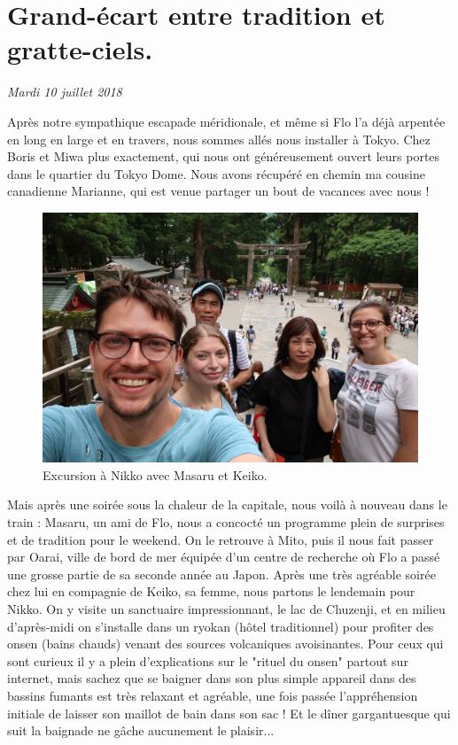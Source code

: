 \hypertarget{grand-uxe9cart-entre-tradition-et-gratte-ciels.}{%
\section{Grand-écart entre tradition et
gratte-ciels.}\label{grand-uxe9cart-entre-tradition-et-gratte-ciels.}}

\emph{Mardi 10 juillet 2018}

Après notre sympathique escapade méridionale, et même si Flo l'a déjà
arpentée en long en large et en travers, nous sommes allés nous
installer à Tokyo. Chez Boris et Miwa plus exactement, qui nous ont
généreusement ouvert leurs portes dans le quartier du Tokyo Dome. Nous
avons récupéré en chemin ma cousine canadienne Marianne, qui est venue
partager un bout de vacances avec nous !

\begin{figure}
\centering
\includegraphics{images/20180710_nikko.JPG}
\caption{Excursion à Nikko avec Masaru et Keiko.}
\end{figure}

Mais après une soirée sous la chaleur de la capitale, nous voilà à
nouveau dans le train : Masaru, un ami de Flo, nous a concocté un
programme plein de surprises et de tradition pour le weekend. On le
retrouve à Mito, puis il nous fait passer par Oarai, ville de bord de
mer équipée d'un centre de recherche où Flo a passé une grosse partie de
sa seconde année au Japon. Après une très agréable soirée chez lui en
compagnie de Keiko, sa femme, nous partons le lendemain pour Nikko. On y
visite un sanctuaire impressionnant, le lac de Chuzenji, et en milieu
d'après-midi on s'installe dans un ryokan (hôtel traditionnel) pour
profiter des onsen (bains chauds) venant des sources volcaniques
avoisinantes. Pour ceux qui sont curieux il y a plein d'explications sur
le "rituel du onsen" partout sur internet, mais sachez que se baigner
dans son plus simple appareil dans des bassins fumants est très relaxant
et agréable, une fois passée l'appréhension initiale de laisser son
maillot de bain dans son sac ! Et le dîner gargantuesque qui suit la
baignade ne gâche aucunement le plaisir...

